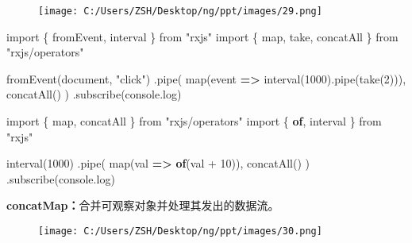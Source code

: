 \documentclass[
]{article}
\newenvironment{Shaded}{}{}
\newcommand{\BuiltInTok}[1]{#1}
\newcommand{\DecValTok}[1]{\textcolor[rgb]{0.25,0.63,0.44}{#1}}
\newcommand{\FunctionTok}[1]{\textcolor[rgb]{0.02,0.16,0.49}{#1}}
\newcommand{\ImportTok}[1]{#1}
\newcommand{\KeywordTok}[1]{\textcolor[rgb]{0.00,0.44,0.13}{\textbf{#1}}}
\newcommand{\NormalTok}[1]{#1}
\newcommand{\OperatorTok}[1]{\textcolor[rgb]{0.40,0.40,0.40}{#1}}
\newcommand{\StringTok}[1]{\textcolor[rgb]{0.25,0.44,0.63}{#1}}
\begin{document}
\begin{figure}
\centering
\texttt{[image: C:/Users/ZSH/Desktop/ng/ppt/images/29.png]}
\caption{}
\end{figure}

\begin{Shaded}
\begin{Highlighting}[]
\ImportTok{import}\NormalTok{ \{ fromEvent}\OperatorTok{,}\NormalTok{ interval \} }\ImportTok{from} \StringTok{"rxjs"}
\ImportTok{import}\NormalTok{ \{ map}\OperatorTok{,}\NormalTok{ take}\OperatorTok{,}\NormalTok{ concatAll \} }\ImportTok{from} \StringTok{"rxjs/operators"}

\FunctionTok{fromEvent}\NormalTok{(}\BuiltInTok{document}\OperatorTok{,} \StringTok{"click"}\NormalTok{)}
  \OperatorTok{.}\FunctionTok{pipe}\NormalTok{(}
    \FunctionTok{map}\NormalTok{(}\BuiltInTok{event} \KeywordTok{=\textgreater{}} \FunctionTok{interval}\NormalTok{(}\DecValTok{1000}\NormalTok{)}\OperatorTok{.}\FunctionTok{pipe}\NormalTok{(}\FunctionTok{take}\NormalTok{(}\DecValTok{2}\NormalTok{)))}\OperatorTok{,}
    \FunctionTok{concatAll}\NormalTok{()}
\NormalTok{  )}
  \OperatorTok{.}\FunctionTok{subscribe}\NormalTok{(}\BuiltInTok{console}\OperatorTok{.}\FunctionTok{log}\NormalTok{)}
\end{Highlighting}
\end{Shaded}

\begin{Shaded}
\begin{Highlighting}[]
\ImportTok{import}\NormalTok{ \{ map}\OperatorTok{,}\NormalTok{ concatAll \} }\ImportTok{from} \StringTok{"rxjs/operators"}
\ImportTok{import}\NormalTok{ \{ }\KeywordTok{of}\OperatorTok{,}\NormalTok{ interval \} }\ImportTok{from} \StringTok{"rxjs"}

\FunctionTok{interval}\NormalTok{(}\DecValTok{1000}\NormalTok{)}
  \OperatorTok{.}\FunctionTok{pipe}\NormalTok{(}
    \FunctionTok{map}\NormalTok{(val }\KeywordTok{=\textgreater{}} \KeywordTok{of}\NormalTok{(val }\OperatorTok{+} \DecValTok{10}\NormalTok{))}\OperatorTok{,}
    \FunctionTok{concatAll}\NormalTok{()}
\NormalTok{  )}
  \OperatorTok{.}\FunctionTok{subscribe}\NormalTok{(}\BuiltInTok{console}\OperatorTok{.}\FunctionTok{log}\NormalTok{)}
\end{Highlighting}
\end{Shaded}

\textbf{concatMap：}合并可观察对象并处理其发出的数据流。

\begin{figure}
\centering
\texttt{[image: C:/Users/ZSH/Desktop/ng/ppt/images/30.png]}
\caption{}
\end{figure}
\end{document}
